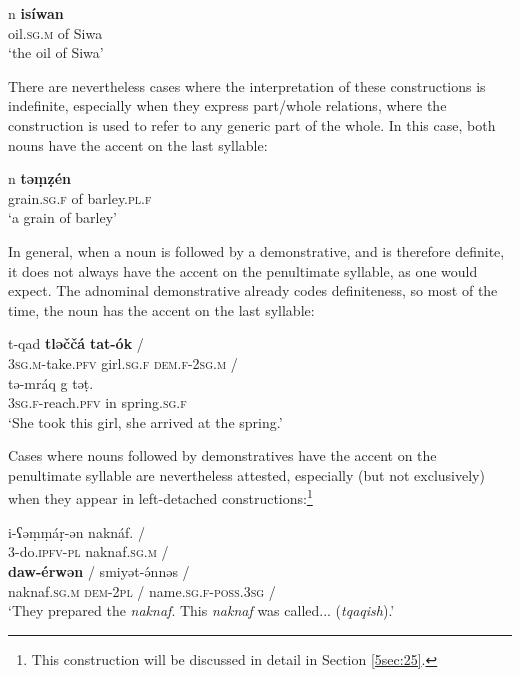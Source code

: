 \documentclass[output=paper]{langsci/langscibook}
\begin{document}
\begin{exe}
\ex\label{5ex:24}
	n	{\textbf{isíwan}} \\
	oil.{\textsc{sg.m}}	of	Siwa \\
\glt	`the oil of Siwa'
\end{exe}

There are nevertheless cases where the interpretation of these constructions is indefinite, especially when they express part/whole relations, where the construction is used to refer to any generic part of the whole. In this case, both nouns have the accent on the last syllable:

\begin{exe}
\ex\label{5ex:25}
	n	{\textbf{təṃẓén}} \\
	grain.{\textsc{sg.f}}	of	barley.{\textsc{pl.f}} \\
\glt	`a grain of barley'
\end{exe}

In general, when a noun is followed by a demonstrative, and is therefore definite, it does not always have the accent on the penultimate syllable, as one would expect. The adnominal demonstrative already codes definiteness, so most of the time, the noun has the accent on the last syllable:

\begin{exe}
\ex\label{5ex:26}
\gll	t-qad		{\textbf{tləččá}}	{\textbf{tat-ók}}	/ \\
	{\textsc{3sg.m}}-take.{\textsc{pfv}}	girl.{\textsc{sg.f}}	{\textsc{dem.f-2sg.m}}	/ \\
\glt 
\exi{}
\gll	tə-mráq	g	təṭ. \\
	{\textsc{3sg.f}}-reach.{\textsc{pfv}}	in	spring.{\textsc{sg.f}} \\
\glt	`She took this girl, she arrived at the spring.'
\end{exe}

Cases where nouns followed by demonstratives have the accent on the penultimate syllable are nevertheless attested, especially (but not exclusively) when they appear in left-detached constructions:\footnote{This construction will be discussed in detail in Section \ref{5sec:25}.}

\begin{exe}
\ex\label{5ex:27}
\gll	i-ʕəṃṃáṛ-ən	naknáf.	/ \\
	3-do.{\textsc{ipfv-pl}}	naknaf.{\textsc{sg.m}}	/ \\
\glt
\exi{}
	{\textbf{daw-érwən}}	/	smiyət-ə́nnəs	/ \\
	naknaf.{\textsc{sg.m}}	{\textsc{dem-2pl}}	/	name.{\textsc{sg.f-poss.3sg}}	/ \\
\glt	`They prepared the {\emph{naknaf}}. This {\emph{naknaf}} was called... ({\emph{tqaqish}}).'
\end{exe}
\end{document}
